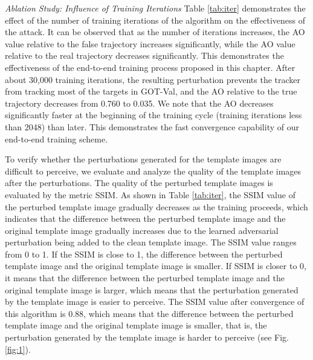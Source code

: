 \documentclass[journal]{IEEEtran}
\begin{document}
\textit{Ablation Study: Influence of Training Iterations} Table \ref{tab:iter} demonstrates the effect of the number of training iterations of the algorithm on the effectiveness of the attack. It can be observed that as the number of iterations increases, the AO value relative to the false trajectory increases significantly, while the AO value relative to the real trajectory decreases significantly. This demonstrates the effectiveness of the end-to-end training process proposed in this chapter.
After about 30,000 training iterations, the resulting perturbation prevents the tracker from tracking most of the targets in GOT-Val, and the AO relative to the true trajectory decreases from 0.760 to 0.035.
We note that the AO decreases significantly faster at the beginning of the training cycle (training iterations less than 2048) than later. This demonstrates the fast convergence capability of our end-to-end training scheme.

To verify whether the perturbations generated for the template images are difficult to perceive, we evaluate and analyze the quality of the template images after the perturbations. The quality of the perturbed template images is evaluated by the metric SSIM. As shown in Table \ref{tab:iter}, the SSIM value of the perturbed template image gradually decreases as the training proceeds, which indicates that the difference between the perturbed template image and the original template image gradually increases due to the learned adversarial perturbation being added to the clean template image. The SSIM value ranges from 0 to 1. If the SSIM is close to 1, the difference between the perturbed template image and the original template image is smaller. If SSIM is closer to 0, it means that the difference between the perturbed template image and the original template image is larger, which means that the perturbation generated by the template image is easier to perceive. The SSIM value after convergence of this algorithm is 0.88, which means that the difference between the perturbed template image and the original template image is smaller, that is, the perturbation generated by the template image is harder to perceive (see Fig. \ref{fig:1}).
\end{document}
